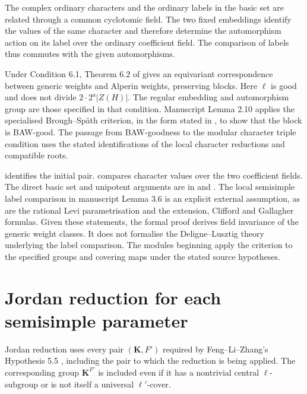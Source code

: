 The complex ordinary characters and the ordinary labels in the basic set are
related through a common cyclotomic field. The two fixed embeddings identify
the values of the same character and therefore determine the automorphism
action on its label over the ordinary
coefficient field. The comparison of labels thus commutes with the given
automorphisms.

Under Condition 6.1, Theorem 6.2 of \cite{FengMalleZhang2026} gives an
equivariant correspondence between generic weights and Alperin weights,
preserving blocks. Here $\ell$ is good and does not divide
$2\cdot2^a|Z(H)|$. The regular embedding and automorphism group are those
specified in that condition. Manuscript Lemma 2.10 applies the specialised
Brough--Sp\"ath criterion, in the form stated in
\cite[Theorem~3.18]{FengLiZhang2022Jordan}, to show that the block is
BAW-good. The passage from BAW-goodness to the modular character triple
condition uses the stated identifications of the local character reductions
and compatible roots.

\begin{implementation}
 identifies the initial
pair. 
compares character values over the two coefficient fields. The direct basic
set and unipotent arguments are in  and
.
The local semisimple label comparison in manuscript Lemma 3.6 is an explicit external
assumption, as are the rational Levi parametrisation and the extension,
Clifford and Gallagher formulas. Given these statements, the formal proof
derives field invariance of the generic weight classes. It does not formalise
the Deligne--Lusztig theory underlying the label comparison.
The modules beginning
 apply the criterion to the specified groups and covering maps under the stated source hypotheses.
\end{implementation}

\section{Jordan reduction for each semisimple parameter}

Jordan reduction uses every pair $(\mathbf K,F')$ required by Feng--Li--Zhang's Hypothesis 5.5 \cite{FengLiZhang2022Jordan}, including the pair to which the reduction is being applied. The corresponding group $\mathbf K^{F'}$ is included even if it has a nontrivial central $\ell$-subgroup or is not itself a universal $\ell'$-cover.


